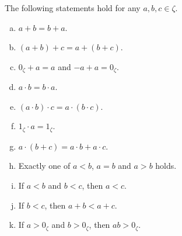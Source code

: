 \documentclass[11pt]{article}
\begin{document}
\begin{theorem}
  The following statements hold for any $a, b, c \in \zeta$.
  \begin{enumerate}[(a)]
    \item $a + b = b + a$.
    \item $(a + b) + c = a + (b + c)$.
    \item $0_\zeta + a = a$ and $-a + a = 0_\zeta$.
    \item $a \cdot b = b \cdot a$.
    \item $(a \cdot b) \cdot c = a \cdot (b \cdot c)$.
    \item $1_\zeta \cdot a = 1_\zeta$.
    \item $a \cdot (b + c) = a \cdot b + a \cdot c$.
    \item Exactly one of $a < b$, $a = b$ and $a > b$ holds.
    \item If $a < b$ and $b < c$, then $a < c$.
    \item If $b < c$, then $a + b < a + c$.
    \item If $a > 0_\zeta$ and $b > 0_\zeta$, then $ab > 0_\zeta$.
  \end{enumerate}
\end{theorem}
\end{document}
